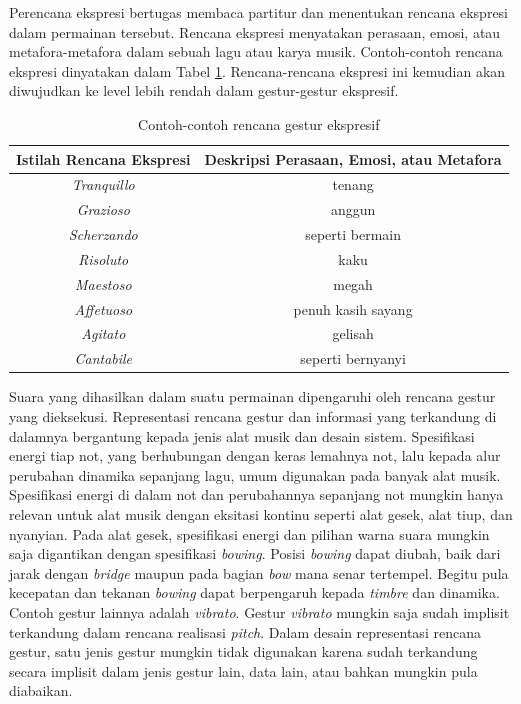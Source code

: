 Perencana ekspresi bertugas membaca partitur dan menentukan rencana ekspresi dalam permainan tersebut. Rencana ekspresi menyatakan perasaan, emosi, atau metafora-metafora dalam sebuah lagu atau karya musik. Contoh-contoh rencana ekspresi dinyatakan dalam Tabel \ref{tab-expression-plan}. Rencana-rencana ekspresi ini kemudian akan diwujudkan ke level lebih rendah dalam gestur-gestur ekspresif. \parencite{yang2016synthesis} \parencite{li2015emt}

\begin{table}[h]
    \centering
    \caption{Contoh-contoh rencana gestur ekspresif \parencite{yang2016synthesis} \parencite{li2015emt}}\label{tab-expression-plan}
    \begin{tabular}{ |c|c| } 
     \hline
     \textbf{Istilah Rencana Ekspresi} & \textbf{Deskripsi Perasaan, Emosi, atau Metafora} \\
     \hline 
     \textit{Tranquillo} & tenang \\
     \hline 
     \textit{Grazioso} & anggun \\
     \hline
     \textit{Scherzando} & seperti bermain \\
     \hline
     \textit{Risoluto} & kaku \\
     \hline
     \textit{Maestoso} & megah \\
     \hline
     \textit{Affetuoso} & penuh kasih sayang \\
     \hline
     \textit{Agitato} & gelisah \\
     \hline
     \textit{Cantabile} & seperti bernyanyi \\
     \hline
    \end{tabular}
\end{table}

Suara yang dihasilkan dalam suatu permainan dipengaruhi oleh rencana gestur yang dieksekusi. Representasi rencana gestur dan informasi yang terkandung di dalamnya bergantung kepada jenis alat musik dan desain sistem. Spesifikasi energi tiap not, yang berhubungan dengan keras lemahnya not, lalu kepada alur perubahan dinamika sepanjang lagu, umum digunakan pada banyak alat musik. Spesifikasi energi di dalam not dan perubahannya sepanjang not mungkin hanya relevan untuk alat musik dengan eksitasi kontinu seperti alat gesek, alat tiup, dan nyanyian. Pada alat gesek, spesifikasi energi dan pilihan warna suara mungkin saja digantikan dengan spesifikasi \textit{bowing}. Posisi \textit{bowing} dapat diubah, baik dari jarak dengan \textit{bridge} maupun pada bagian \textit{bow} mana senar tertempel. Begitu pula kecepatan dan tekanan \textit{bowing} dapat berpengaruh kepada \textit{timbre} dan dinamika. \parencite{yu2017bowing} Contoh gestur lainnya adalah \textit{vibrato}. Gestur \textit{vibrato} mungkin saja sudah implisit terkandung dalam rencana realisasi \textit{pitch}. Dalam desain representasi rencana gestur, satu jenis gestur mungkin tidak digunakan karena sudah terkandung secara implisit dalam jenis gestur lain, data lain, atau bahkan mungkin pula diabaikan.

